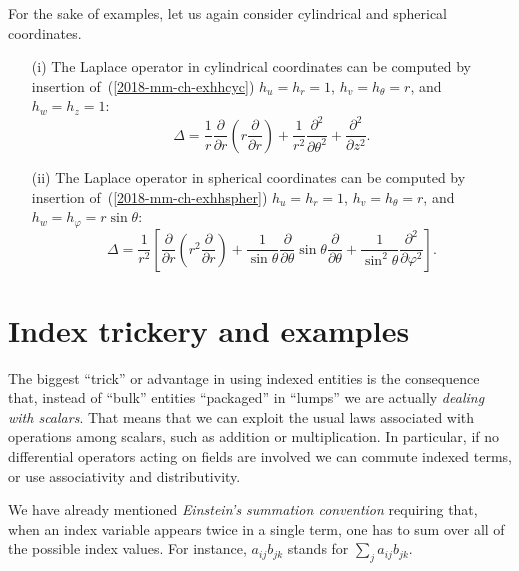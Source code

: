 {
\color{blue}
\bexample
For the sake of examples, let us again consider cylindrical and spherical coordinates.

\begin{itemize}
\item[(i)]
The Laplace operator in cylindrical coordinates
can be computed by insertion of~(\ref{2018-mm-ch-exhhcyc})
$h_u=h_r= 1$, $h_v=h_\theta= r$, and $h_w=h_z= 1$:
\begin{equation}
\Delta
=
\frac{ 1 }{r}
\frac{\partial   }{\partial r} \left( r  \frac{\partial   }{\partial r} \right) +
\frac{ 1 }{r^2} \frac{\partial^2   }{\partial \theta^2}  +
\frac{\partial^2   }{\partial z^2}
.
\label{2018-mm-ch-laplaceocylin}
\end{equation}


\item[(ii)]
The Laplace operator in spherical coordinates
can be computed by insertion of~(\ref{2018-mm-ch-exhhspher})
$h_u=h_r= 1$, $h_v=h_\theta= r$, and $h_w=h_\varphi= r \sin \theta$:
\begin{equation}
\Delta
=
\frac{1}{r^2} \left[ \frac{\partial}{\partial r}\left( r^2\frac{\partial}{\partial r}\right)
+
\frac{1}{\sin \theta}   \frac{\partial}{\partial \theta }
\sin \theta \frac{\partial}{\partial \theta }
+
\frac{1}{\sin^2 \theta} \frac{\partial^2}{\partial \varphi^2 }
\right]
.
\label{2018-mm-ch-laplaceocsc}
\end{equation}
\end{itemize}

\eexample
}


\section{Index trickery and examples}

The biggest ``trick'' or advantage in using indexed entities is the consequence
that, instead of ``bulk'' entities ``packaged'' in ``lumps'' we are actually {\em dealing with scalars}.
That means that we can exploit the usual laws associated with operations among scalars, such as addition or multiplication.
In particular, if no differential operators acting on fields are involved we can
commute indexed terms, or use associativity and distributivity.

We have already mentioned {\em Einstein's summation convention}
requiring that, when an index variable appears twice in a single term, one has to
sum over all of the possible index values. For instance, $a_{ij}b_{jk}$ stands for $\sum_j a_{ij}b_{jk}$.


